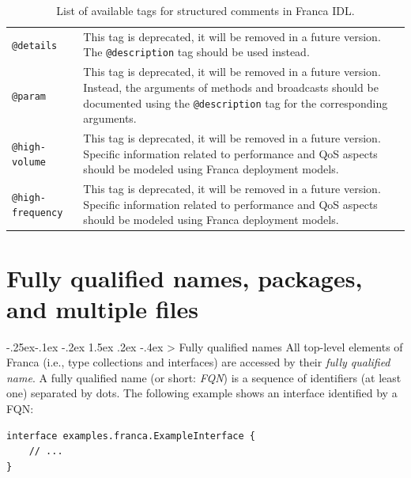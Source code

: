 \documentclass[a4paper,10pt]{scrreprt}
\makeatletter
\renewcommand\subsection{\medskip\@startsection{subsection}{2}{\z@}%
  {-.25ex\@plus -.1ex \@minus -.2ex}%
  {1.5ex \@plus .2ex \@minus -.4ex}%
  {\ifnum \scr@compatibility>\@nameuse{scr@v@2.96}\relax
    \setlength{\parfillskip}{\z@ plus 1fil}\fi
    \raggedsection\normalfont\sectfont\nobreak\size@subsection
  }%
}
\newlength{\XdocTEffectiveWidth}
\makeatother
\begin{document}
\begin{table}
\begin{tabular}{p{0.22\XdocTEffectiveWidth}p{0.78\XdocTEffectiveWidth}}
\\
\protect\lstinline[language=Franca]�@details�

 & This tag is deprecated, it will be removed in a future version.
		   The \protect\lstinline[language=Franca]�@description� tag should be used instead.

\\
\protect\lstinline[language=Franca]�@param�

 & This tag is deprecated, it will be removed in a future version.
		   Instead, the arguments of methods and broadcasts should be documented using
		   the \protect\lstinline[language=Franca]�@description� tag for the corresponding arguments.

\\
\protect\lstinline[language=Franca]�@high-volume�

 & This tag is deprecated, it will be removed in a future version.
		   Specific information related to performance and QoS aspects should be
		   modeled using Franca deployment models.

\\
\protect\lstinline[language=Franca]�@high-frequency�

 & This tag is deprecated, it will be removed in a future version.
		   Specific information related to performance and QoS aspects should be
		   modeled using Franca deployment models.

\\
\bottomrule
\end{tabular}
\caption{List of available tags for structured comments in Franca IDL.}
\label{CommentTags}
\end{table}


\section{Fully qualified names, packages, and multiple files}
\label{FIDL_MultipleFiles}
\subsection{Fully qualified names}
\label{FIDL_MultipleFiles_FQN}
All top-level elements of Franca (i.e., type collections and interfaces)
are accessed by their \textit{fully qualified name}.
A fully qualified name (or short: \textit{FQN}) is a sequence of identifiers (at least one)
separated by dots. The following example shows an interface identified by a FQN: 

\begin{lstlisting}[language=Franca]
interface examples.franca.ExampleInterface {
	// ...
}
\end{lstlisting}
\end{document}
